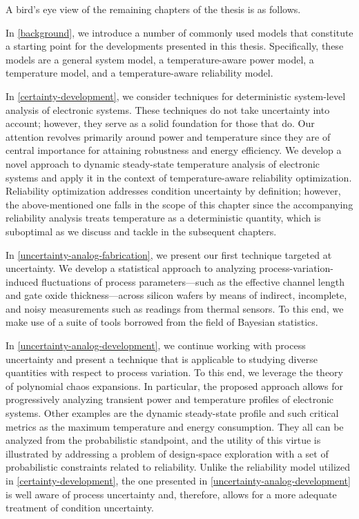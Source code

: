 A bird's eye view of the remaining chapters of the thesis is as follows.

In \cref{background}, we introduce a number of commonly used models that
constitute a starting point for the developments presented in this thesis.
Specifically, these models are a general system model, a temperature-aware power
model, a temperature model, and a temperature-aware reliability model.

In \cref{certainty-development}, we consider techniques for deterministic
system-level analysis of electronic systems. These techniques do not take
uncertainty into account; however, they serve as a solid foundation for those
that do. Our attention revolves primarily around power and temperature since
they are of central importance for attaining robustness and energy efficiency.
We develop a novel approach to dynamic steady-state temperature analysis of
electronic systems and apply it in the context of temperature-aware reliability
optimization. Reliability optimization addresses condition uncertainty by
definition; however, the above-mentioned one falls in the scope of this chapter
since the accompanying reliability analysis treats temperature as a
deterministic quantity, which is suboptimal as we discuss and tackle in the
subsequent chapters.

In \cref{uncertainty-analog-fabrication}, we present our first technique
targeted at uncertainty. We develop a statistical approach to analyzing
process-variation-induced fluctuations of process parameters---such as the
effective channel length and gate oxide thickness---across silicon wafers by
means of indirect, incomplete, and noisy measurements such as readings from
thermal sensors. To this end, we make use of a suite of tools borrowed from the
field of Bayesian statistics.

In \cref{uncertainty-analog-development}, we continue working with process
uncertainty and present a technique that is applicable to studying diverse
quantities with respect to process variation. To this end, we leverage the
theory of polynomial chaos expansions. In particular, the proposed approach
allows for progressively analyzing transient power and temperature profiles of
electronic systems. Other examples are the dynamic steady-state profile and such
critical metrics as the maximum temperature and energy consumption. They all can
be analyzed from the probabilistic standpoint, and the utility of this virtue is
illustrated by addressing a problem of design-space exploration with a set of
probabilistic constraints related to reliability. Unlike the reliability model
utilized in \cref{certainty-development}, the one presented in
\cref{uncertainty-analog-development} is well aware of process uncertainty and,
therefore, allows for a more adequate treatment of condition uncertainty.

